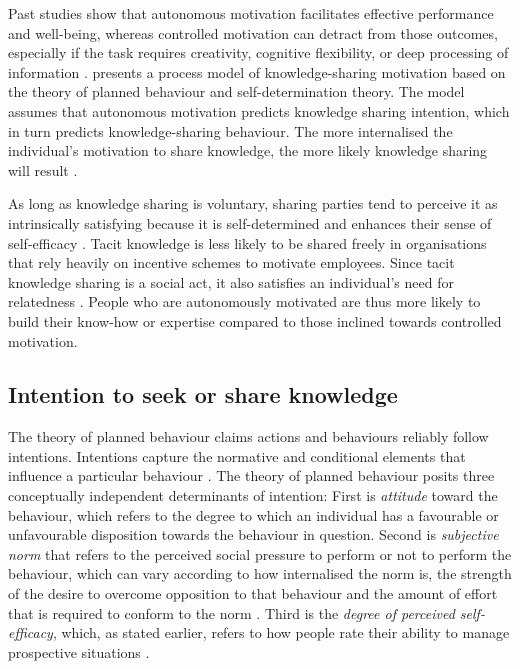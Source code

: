 Past studies show that autonomous motivation facilitates effective performance and well-being, whereas controlled motivation can detract from those outcomes, especially if the task requires creativity, cognitive flexibility, or deep processing of information \citep{gagne2005self}. \citet{gagne2009model} presents a process model of knowledge-sharing motivation based on the theory of planned behaviour and self-determination theory. The model assumes that autonomous motivation predicts knowledge sharing intention, which in turn predicts knowledge-sharing behaviour. The more internalised the individual's motivation to share knowledge, the more likely knowledge sharing will result \citep{gagne2009model,witherspoon2013antecedents}. \medskip

As long as knowledge sharing is voluntary, sharing parties tend to perceive it as intrinsically satisfying because it is self-determined and enhances their sense of self-efficacy \citep{lam2010knowledge,dumbach2014establishing}.  Tacit knowledge is less likely to be shared freely in organisations that rely heavily on incentive schemes to motivate employees. Since tacit knowledge sharing is a social act, it also satisfies an individual's need for relatedness \citep{llopis2016understanding}. People who are autonomously motivated are thus more likely to build their know-how or expertise compared to those inclined towards controlled motivation.

\subsection{Intention to seek or share knowledge}

The theory of planned behaviour claims actions and behaviours reliably follow intentions. Intentions capture the normative and conditional elements that influence a particular behaviour \citep{ajzen1985intentions}. The theory of planned behaviour posits three conceptually independent determinants of intention: First is \textit{attitude} toward the behaviour, which refers to the degree to which an individual has a favourable or unfavourable disposition towards the behaviour in question. Second is \textit{subjective norm} that refers to the perceived social pressure to perform or not to perform the behaviour, which can vary according to how internalised the norm is, the strength of the desire to overcome opposition to that behaviour and the amount of effort that is required to conform to the norm \citep{loyal2001agency}. Third is the \textit{degree of perceived self-efficacy}, which, as stated earlier, refers to how people rate their ability to manage prospective situations \citep{bandura1982self,ajzen1991theory}. \medskip

